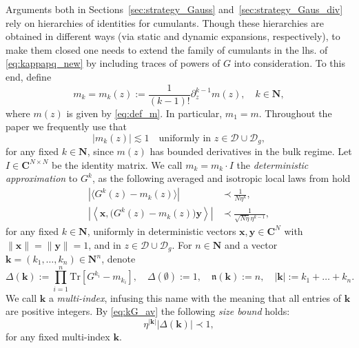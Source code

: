 \documentclass[10pt]{amsart}
\numberwithin{equation}{section}
\newcommand{\C}{\mathbf{C}}
\newcommand{\N}{\mathbf{N}}
\begin{document}
Arguments both in Sections~\ref{sec:strategy_Gauss} and~\ref{sec:strategy_Gaus_div} rely on hierarchies of identities for cumulants. Though these hierarchies are obtained in different ways (via static and dynamic expansions, respectively), to make them closed one needs to extend the family of cumulants in the lhs. of \eqref{eq:kappapq_new} by including traces of powers of $G$ into consideration.  To this end, define
\begin{equation}\label{def:mk}
m_k=m_k(z):=\frac{1}{(k-1)!}\partial_z^{k-1} m(z),\quad k\in\N,
\end{equation}
where $m(z)$ is given by \eqref{eq:def_m}. In particular, $m_1=m$. Throughout the paper we frequently use that
\begin{equation}
|m_k(z)|\lesssim 1\quad\text{uniformly in}\,\, z\in\mathcal{D}\cup\mathcal{D}_g, 
\label{eq:m_bound}
\end{equation}
for any fixed $k\in\N$, since $m(z)$ has bounded derivatives in the bulk regime. Let $I\in\C^{N\times N}$ be the identity matrix. We call $m_k= m_k\cdot I$ the \emph{deterministic approximation} to $G^k$, as the following averaged and isotropic local laws from \cite[Theorem~2.5]{Multi_res_llaws} hold 
\begin{align}
\left\vert\langle G^k(z)-m_k(z)\rangle\right\vert & \prec\frac{1}{N\eta^k},\label{eq:kG_av}\\
\left\vert\left\langle \bm{x},\big( G^k(z)-m_k(z)\big)\bm{y}\right\rangle\right\vert &\prec \frac{1}{\sqrt{N\eta}\eta^{k-1}},\label{eq:kG_iso}
\end{align}
for any fixed $k\in \N$, uniformly in deterministic vectors $\bm{x},\bm{y}\in\C^N$ with $\|\bm{x}\|=\|\bm{y}\|=1$, and in $z\in\mathcal{D}\cup\mathcal{D}_g$. For $n\in\N$ and a vector $\bm{k}=(k_1,\ldots,k_n)\in\N^n$, denote
\begin{equation}
\Delta(\bm{k}):=\prod_{i=1}^n \mathrm{Tr}\left[ G^{k_i}-m_{k_i}\right],\quad \Delta(\emptyset):=1,\quad \mathfrak{n}(\bm{k}):=n,\quad |\bm{k}|:=k_1+\ldots+k_n.
\label{eq:def_Delta}
\end{equation}
We call $\bm{k}$ a \emph{multi-index}, infusing this name with the meaning that all entries of $\bm{k}$ are positive integers. By \eqref{eq:kG_av} the following \emph{size bound} holds: 
\begin{equation}
\eta^{|\bm{k}|} \left\vert \Delta(\bm{k})\right\vert \prec 1,
\label{eq:Delta_a_priori}
\end{equation}
for any fixed multi-index $\bm{k}$.
\end{document}
